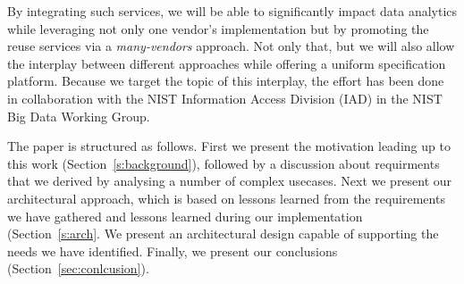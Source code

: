 By integrating such services, we will be able to significantly impact
data analytics while leveraging not only one vendor's implementation
but by promoting the reuse services via a {\em many-vendors}
approach. Not only that, but we will also allow the interplay between
different approaches while offering a uniform specification platform.
Because we target the topic of this interplay, the effort has been
done in collaboration with the NIST Information Access Division (IAD)
in the NIST Big Data Working Group.

The paper is structured as follows. First we present the motivation
leading up to this work (Section~\ref{s:background}), followed by a
discussion about requirments that we derived by analysing a number of
complex usecases. Next we present our architectural approach, which is
based on lessons learned from the requirements we have gathered and
lessons learned during our implementation (Section~\ref{s:arch}. We
present an architectural design capable of supporting the needs we
have identified.  Finally, we present our conclusions
(Section~\ref{sec:conlcusion}).
